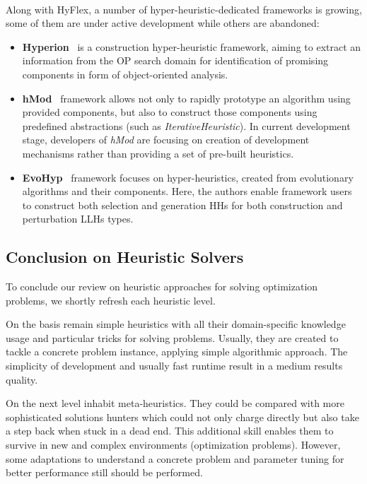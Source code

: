 \paragraph{}
Along with HyFlex, a number of hyper-heuristic-dedicated frameworks is growing, some of them are under active development while others are abandoned:
\begin{itemize}
	\item \textbf{Hyperion}~\cite{swan2011hyperion} is a construction hyper-heuristic framework, aiming to extract an information from the OP search domain for identification of promising components in form of object-oriented analysis.
	
	\item \textbf{hMod}~\cite{urra2013hMod} framework allows not only to rapidly prototype an algorithm using provided components, but also to construct those components using predefined abstractions (such as \emph{IterativeHeuristic}). In current development stage, developers of \emph{hMod} are focusing on creation of development mechanisms rather than providing a set of pre-built heuristics. 
	
	\item \textbf{EvoHyp}~\cite{pillay2017evohyp} framework focuses on hyper-heuristics, created from evolutionary algorithms and their components. Here, the authors enable framework users to construct both selection and generation HHs for both construction and perturbation LLHs types.
\end{itemize}


\subsection{Conclusion on Heuristic Solvers}
To conclude our review on heuristic approaches for solving optimization problems, we shortly refresh each heuristic level.

On the basis remain simple heuristics with all their domain-specific knowledge usage and particular tricks for solving problems. Usually, they are created to tackle a concrete problem instance, applying simple algorithmic approach. The simplicity of development and usually fast runtime result in a medium results quality.

On the next level inhabit meta-heuristics. They could be compared with more sophisticated solutions hunters which could not only charge directly but also take a step back when stuck in a dead end. This additional skill enables them to survive in new and complex environments (optimization problems). However, some adaptations to understand a concrete problem and parameter tuning for better performance still should be performed.

